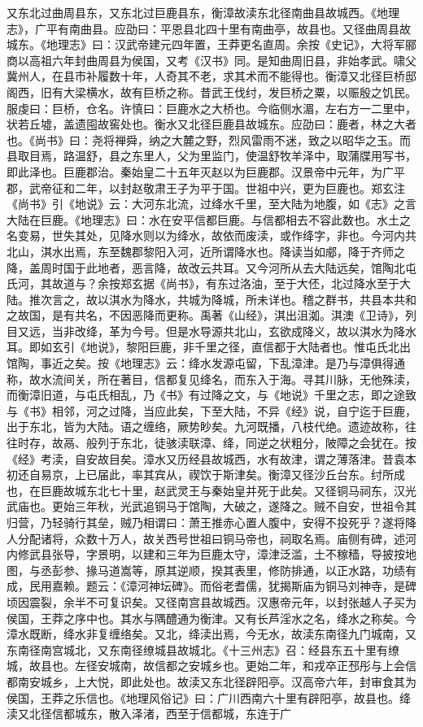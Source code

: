 \documentclass[12pt,UTF8]{ctexbook}
\begin{document}
又东北过曲周县东，又东北过巨鹿县东，衡漳故渎东北径南曲县故城西。《地理志》，广平有南曲县。应劭曰：平恩县北四十里有南曲亭，故县也。又径曲周县故城东。《地理志》曰：汉武帝建元四年置，王莽更名直周。余按《史记》，大将军郦商以高祖六年封曲周县为侯国，又考《汉书》同。是知曲周旧县，非始孝武。啸父冀州人，在县市补履数十年，人奇其不老，求其术而不能得也。衡漳又北径巨桥邸阁西，旧有大梁横水，故有巨桥之称。昔武王伐纣，发巨桥之粟，以赈殷之饥民。服虔曰：巨桥，仓名。许慎曰：巨鹿水之大桥也。今临侧水湄，左右方一二里中，状若丘墟，盖遗囤故窖处也。衡水又北径巨鹿县故城东。应劭曰：鹿者，林之大者也。《尚书》曰：尧将禅舜，纳之大麓之野，烈风雷雨不迷，致之以昭华之玉。而县取目焉，路温舒，县之东里人，父为里监门，使温舒牧羊泽中，取蒲牒用写书，即此泽也。巨鹿郡治。秦始皇二十五年灭赵以为巨鹿郡。汉景帝中元年，为广平郡，武帝征和二年，以封赵敬肃王子为平于国。世祖中兴，更为巨鹿也。郑玄注《尚书》引《地说》云：大河东北流，过绛水千里，至大陆为地腹，如《志》之言大陆在巨鹿。《地理志》曰：水在安平信都巨鹿。与信都相去不容此数也。水土之名变易，世失其处，见降水则以为绛水，故依而废渎，或作绛字，非也。今河内共北山，淇水出焉，东至魏郡黎阳入河，近所谓降水也。降读当如郕，降于齐师之降，盖周时国于此地者，恶言降，故改云共耳。又今河所从去大陆远矣，馆陶北屯氏河，其故道与？余按郑玄据《尚书》，有东过洛油，至于大伾，北过降水至于大陆。推次言之，故以淇水为降水，共城为降城，所未详也。稽之群书，共县本共和之故国，是有共名，不因恶降而更称。禹著《山经》，淇出沮洳。淇澳《卫诗》，列目又远，当非改绛，革为今号。但是水导源共北山，玄欲成降义，故以淇水为降水耳。即如玄引《地说》，黎阳巨鹿，非千里之径，直信都于大陆者也。惟屯氏北出馆陶，事近之矣。按《地理志》云：绛水发源屯留，下乱漳津。是乃与漳俱得通称，故水流间关，所在著目，信都复见绛名，而东入于海。寻其川脉，无他殊渎，而衡漳旧道，与屯氏相乱，乃《书》有过降之文，与《地说》千里之志，即之途致与《书》相邻，河之过降，当应此矣，下至大陆，不异《经》说，自宁迄于巨鹿，出于东北，皆为大陆。语之缠络，厥势眇矣。九河既播，八枝代绝。遗迹故称，往往时存，故鬲、般列于东北，徒骇渎联漳、绛，同逆之状粗分，陂障之会犹在。按《经》考渎，自安故目矣。漳水又历经县故城西，水有故津，谓之薄落津。昔袁本初还自易京，上已届此，率其宾从，禊饮于斯津矣。衡漳又径沙丘台东。纣所成也，在巨鹿故城东北七十里，赵武灵王与秦始皇并死于此矣。又径铜马祠东，汉光武庙也。更始三年秋，光武追铜马于馆陶，大破之，遂降之。贼不自安，世祖令其归营，乃轻骑行其垒，贼乃相谓曰：萧王推赤心置人腹中，安得不投死乎？遂将降人分配诸将，众数十万人，故关西号世祖曰铜马帝也，祠取名焉。庙侧有碑，述河内修武县张导，字景明，以建和三年为巨鹿太守，漳津泛滥，土不稼穑，导披按地图，与丞彭参、掾马道嵩等，原其逆顺，揆其表里，修防排通，以正水路，功绩有成，民用嘉赖。题云：《漳河神坛碑》。而俗老耆儒，犹揭斯庙为铜马刘神寺，是碑顷因震裂，余半不可复识矣。又径南宫县故城西。汉惠帝元年，以封张越人子买为侯国，王莽之序中也。其水与隅醴通为衡津。又有长芦淫水之名，绛水之称矣。今漳水既断，绛水非复缠络矣。又北，绛渎出焉，今无水，故渎东南径九门城南，又东南径南宫城北，又东南径缭城县故城北。《十三州志》召：经县东五十里有缭城，故县也。左径安城南，故信都之安城乡也。更始二年，和戎卒正邳彤与上会信都南安城乡，上大悦，即此处也。故渎又东北径辟阳亭。汉高帝六年，封审食其为侯国，王莽之乐信也。《地理风俗记》曰：广川西南六十里有辟阳亭，故县也。绛渎又北径信都城东，散入泽渚，西至于信都城，东连于广
\end{document}
